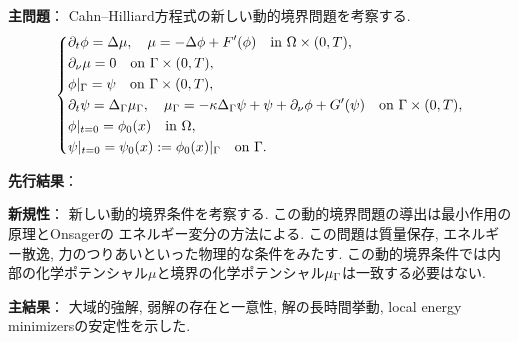 \documentclass[openary, a4paper, oneside]{jsarticle}
\begin{document}
{\bf 主問題}：
Cahn--Hilliard方程式の新しい動的境界問題を考察する.
\begin{equation}\left\{\begin{aligned}
	&\partial_t\phi = \Delta\mu,\quad \mu = -\Delta\phi + F'(\phi) \quad \text{in }\Omega\times(0,T),\\
	&\partial_{\nu}\mu = 0 \quad \text{on }\Gamma\times(0,T),\\
	&\phi|_{\Gamma} = \psi \quad \text{on }\Gamma\times(0,T),\\
	&\partial_t\psi = \Delta_{\Gamma}\mu_{\Gamma},\quad \mu_{\Gamma} = -\kappa\Delta_{\Gamma}\psi + \psi + \partial_{\nu}\phi + G'(\psi) \quad \text{on }\Gamma\times(0,T),\\
	&\phi|_{t=0} = \phi_0(x) \quad \text{in }\Omega,\\
	&\psi|_{t=0} = \psi_0(x) := \phi_0(x)|_{\Gamma} \quad \text{on }\Gamma.
\end{aligned}\right.\end{equation}

{\bf 先行結果}：

{\bf 新規性}：
新しい動的境界条件を考察する.
この動的境界問題の導出は最小作用の原理とOnsagerの
エネルギー変分の方法による.
この問題は質量保存, エネルギー散逸, 力のつりあいといった物理的な条件をみたす.
この動的境界条件では内部の化学ポテンシャル$\mu$と境界の化学ポテンシャル$\mu_{\Gamma}$は一致する必要はない.

{\bf 主結果}：
大域的強解, 弱解の存在と一意性, 解の長時間挙動, local energy minimizersの安定性を示した.
\end{document}
